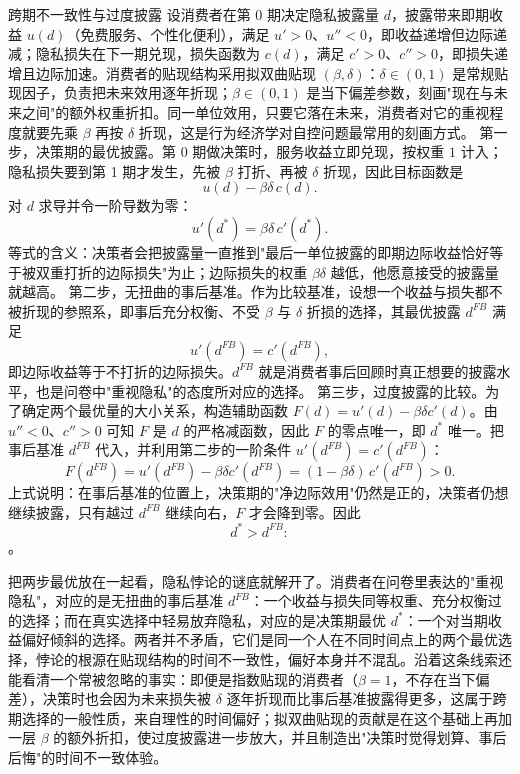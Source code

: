 \begin{derivation}{跨期不一致性与过度披露}{}
设消费者在第 0 期决定隐私披露量 $d$，披露带来即期收益 $u(d)$（免费服务、个性化便利），满足 $u'>0$、$u''<0$，即收益递增但边际递减；隐私损失在下一期兑现，损失函数为 $c(d)$，满足 $c'>0$、$c''>0$，即损失递增且边际加速。消费者的贴现结构采用拟双曲贴现 $(\beta,\delta)$：$\delta\in(0,1)$ 是常规贴现因子，负责把未来效用逐年折现；$\beta\in(0,1)$ 是当下偏差参数，刻画"现在与未来之间"的额外权重折扣。同一单位效用，只要它落在未来，消费者对它的重视程度就要先乘 $\beta$ 再按 $\delta$ 折现，这是行为经济学对自控问题最常用的刻画方式。
第一步，决策期的最优披露。第 0 期做决策时，服务收益立即兑现，按权重 $1$ 计入；隐私损失要到第 1 期才发生，先被 $\beta$ 打折、再被 $\delta$ 折现，因此目标函数是
\[
u(d) - \beta\delta\, c(d).
\]
对 $d$ 求导并令一阶导数为零：
\[
u'(d^*) = \beta\delta\, c'(d^*).
\]
等式的含义：决策者会把披露量一直推到"最后一单位披露的即期边际收益恰好等于被双重打折的边际损失"为止；边际损失的权重 $\beta\delta$ 越低，他愿意接受的披露量就越高。
第二步，无扭曲的事后基准。作为比较基准，设想一个收益与损失都不被折现的参照系，即事后充分权衡、不受 $\beta$ 与 $\delta$ 折损的选择，其最优披露 $d^{FB}$ 满足
\[
u'(d^{FB}) = c'(d^{FB}),
\]
即边际收益等于不打折的边际损失。$d^{FB}$ 就是消费者事后回顾时真正想要的披露水平，也是问卷中"重视隐私"的态度所对应的选择。
第三步，过度披露的比较。为了确定两个最优量的大小关系，构造辅助函数 $F(d) = u'(d) - \beta\delta c'(d)$。由 $u''<0$、$c''>0$ 可知 $F$ 是 $d$ 的严格减函数，因此 $F$ 的零点唯一，即 $d^*$ 唯一。把事后基准 $d^{FB}$ 代入，并利用第二步的一阶条件 $u'(d^{FB}) = c'(d^{FB})$：
\[
F(d^{FB}) = u'(d^{FB}) - \beta\delta c'(d^{FB}) = (1-\beta\delta)\, c'(d^{FB}) > 0.
\]
上式说明：在事后基准的位置上，决策期的"净边际效用"仍然是正的，决策者仍想继续披露，只有越过 $d^{FB}$ 继续向右，$F$ 才会降到零。因此
\[
d^* > d^{FB}:
\]
。
\end{derivation}

把两步最优放在一起看，隐私悖论的谜底就解开了。消费者在问卷里表达的"重视隐私"，对应的是无扭曲的事后基准 $d^{FB}$：一个收益与损失同等权重、充分权衡过的选择；而在真实选择中轻易放弃隐私，对应的是决策期最优 $d^*$：一个对当期收益偏好倾斜的选择。两者并不矛盾，它们是同一个人在不同时间点上的两个最优选择，悖论的根源在贴现结构的时间不一致性，偏好本身并不混乱。沿着这条线索还能看清一个常被忽略的事实：即便是指数贴现的消费者（$\beta=1$，不存在当下偏差），决策时也会因为未来损失被 $\delta$ 逐年折现而比事后基准披露得更多，这属于跨期选择的一般性质，来自理性的时间偏好；拟双曲贴现的贡献是在这个基础上再加一层 $\beta$ 的额外折扣，使过度披露进一步放大，并且制造出"决策时觉得划算、事后后悔"的时间不一致体验。

